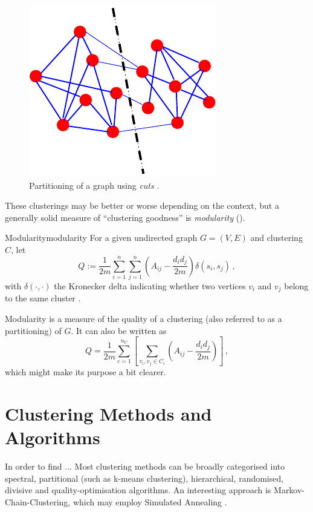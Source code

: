 \documentclass[12pt, a4paper]{article}
\begin{document}
  \begin{figure}[h]
    \centering
    \includegraphics[width=0.3\linewidth]{figures/graphpartitioning.pdf}
    \caption{Partitioning of a graph using \textit{cuts} \parencite{fortunato-2009}.}
  \end{figure}

  These clusterings may be better or worse depending on the context, but a generally solid measure of ``clustering goodness'' is \textit{modularity} ().

  \begin{definition}{Modularity}{modularity}
    For a given undirected graph $G = (V, E)$ and clustering $C$, let $$Q := \frac{1}{2m} \sum_{i=1}^{n} \sum_{j=1}^{n} \left(A_{ij} - \frac{d_i d_j}{2m}\right) \delta(s_i, s_j)\,,$$ with $\delta(\cdot, \cdot)$ the Kronecker delta indicating whether two vertices $v_i$ and $v_j$ belong to the same cluster \parencite{lambiotte-louvain-clustering}.
  \end{definition}

  Modularity is a measure of the quality of a clustering (also referred to as a partitioning) of $G$. It can also be written as
  $$Q = \frac{1}{2m} \sum_{c=1}^{n_C} \left[\sum_{v_i, v_j \in C_i} \left(A_{ij} - \frac{d_i d_j}{2m}\right)\right]\,,$$
  which might make its purpose a bit clearer.

  \section{Clustering Methods and Algorithms}
  In order to find ...
  Most clustering methods can be broadly categorised into spectral, partitional (such as k-means clustering), hierarchical, randomised, divisive and quality-optimisation algorithms.
  An interesting approach is Markov-Chain-Clustering, which may employ Simulated Annealing \cite{fortunato}.
\end{document}
